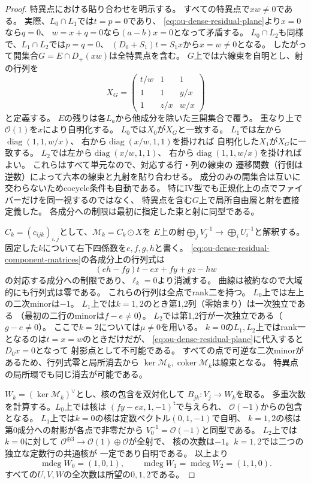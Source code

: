 \begin{proof}
特異点における貼り合わせを明示する。
すべての特異点で$xw\ne0$である。
実際、$L_0\cap L_1$では$t=p=0$であり、
\eqref{eq:ou-dense-residual-plane}より$x=0$なら$q=0$、
$w=x+q=0$なら$(a-b)x=0$となって矛盾する。
$L_0\cap L_2$も同様で、$L_1\cap L_2$では$p=q=0$、
$(D_0+S_1)t=S_1x$から$x=w\ne0$となる。
したがって開集合$G=E\cap D_+(xw)$は全特異点を含む。
$G$上では六線束を自明とし、射の行列を
\begin{equation}\label{eq:ou-dense-residual-common-chart}
 X_G=\begin{pmatrix}
 t/w&1&1\\1&1&y/x\\1&z/x&w/x
 \end{pmatrix}
\end{equation}
と定義する。
$E$の残りは各$L_a$から他成分を除いた三開集合で覆う。
重なり上で$\mathcal O(1)$を$x$により自明化する。
$L_0$では$X_0$が$X_G$と一致する。
$L_1$では左から$\operatorname{diag}(1,1,w/x)$、
右から$\operatorname{diag}(x/w,1,1)$を掛ければ
自明化した$X_1$が$X_G$に一致する。
$L_2$では左から$\operatorname{diag}(x/w,1,1)$、
右から$\operatorname{diag}(1,1,w/x)$を掛ければよい。
これらはすべて単元なので、対応する行・列の線束の
遷移関数（行側は逆数）によって六本の線束と九射を貼り合わせる。
成分のみの開集合は互いに交わらないためcocycle条件も自動である。
特にIV型でも正規化上の点でファイバーだけを同一視するのではなく、
特異点を含む$G$上で局所自由層と射を直接定義した。
各成分への制限は最初に指定した束と射に同型である。

$C_k=(c_{ijk})_{i,j}$として、$\mathscr M_k=C_k\odot X$を
$E$上の射$\bigoplus_j V_j^{-1}\to\bigoplus_i U_i^{-1}$と解釈する。
固定した$k$について右下四係数を$e,f,g,h$と書く。
\eqref{eq:ou-dense-residual-component-matrices}の各成分上の行列式は
\[
 (eh-fg)t-ex+fy+gz-hw
\]
の対応する成分への制限であり、$\ell_k=0$より消滅する。
曲線は被約なので大域的にも行列式は零である。
これらの行列は全点でrank二を持つ。
$L_0$上では左上の二次minorは$-1$。
$L_1$上では$k=1,2$のとき第1,2列（零始まり）は一次独立である
（最初の二行のminorは$f-e\ne0$）。
$L_2$では第1,2行が一次独立である（$g-e\ne0$）。
ここで$k=2$については$\mu\ne0$を用いる。
$k=0$の$L_1,L_2$上ではrank一となるのは$t=x=w$のときだけだが、
\eqref{eq:ou-dense-residual-plane}に代入すると$D_0x=0$となって
射影点として不可能である。
すべての点で可逆な二次minorがあるため、行列式零と局所消去から
$\ker\mathscr M_k,\operatorname{coker}\mathscr M_k$は線束となる。
特異点の局所環でも同じ消去が可能である。

$W_k=(\ker\mathscr M_k)^\vee$とし、核の包含を双対化して
$B_{jk}:V_j\to W_k$を取る。
多重次数を計算する。$L_0$上では核は
$(fy-ex,1,-1)^{\mathsf t}$で与えられ、
$\mathcal O(-1)$からの包含となる。
$L_1$上では$k=0$の核は定数ベクトル$(0,1,-1)$で自明、
$k=1,2$の核は第0成分への射影が各点で非零だから
$V_0^{-1}=\mathcal O(-1)$と同型である。
$L_2$上では$k=0$に対して
$\mathcal O^{\oplus3}\to\mathcal O(1)\oplus\mathcal O$が全射で、
核の次数は$-1$。$k=1,2$では二つの独立な定数行の共通核が
一定であり自明である。
以上より
\[
 \operatorname{mdeg}W_0=(1,0,1),\qquad
 \operatorname{mdeg}W_1=\operatorname{mdeg}W_2=(1,1,0).
\]
すべての$U,V,W$の全次数は所望の$0,1,2$である。


\end{proof}
